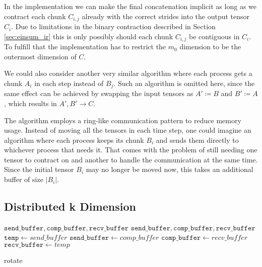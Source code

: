 In the implementation we can make the final concatenation implicit as long as we contract each chunk $C_{i,j}$ already with the correct strides into the output tensor $C_i$.
Due to limitations in the binary contraction described in Section \ref{sec:einsum_ir} this is only possibly should each chunk $C_{i,j}$ be contiguous in $C_i$.
To fulfill that the implementation has to restrict the $m_0$ dimension to be the outermost dimension of $C$.

We could also consider another very similar algorithm where each process gets a chunk $A_i$ in each step instead of $B_j$.
Such an algorithm is omitted here, since the same effect can be achieved by swapping the input tensors as $A' \coloneqq B$ and $B' \coloneqq A$, which results in $A',B' \rightarrow C$.

The algorithm employs a ring-like communication pattern to reduce memory usage.
Instead of moving all the tensors in each time step, one could imagine an algorithm where each process keeps its chunk $B_i$ and sends them directly to whichever process that needs it.
That comes with the problem of still needing one tensor to contract on and another to handle the communication at the same time.
Since the initial tensor $B_i$ may no longer be moved now, this takes an additional buffer of size $|B_i|$.

\subsection{Distributed k Dimension}


\begin{algorithm}[ht]
    \begin{algorithmic}
        \Require $\texttt{send\_buffer},\texttt{comp\_buffer},\texttt{recv\_buffer}$
        \Ensure $\texttt{send\_buffer},\texttt{comp\_buffer},\texttt{recv\_buffer}$
        \State $\texttt{temp} \gets {send\_buffer}$
        \State $\texttt{send\_buffer} \gets {comp\_buffer}$
        \State $\texttt{comp\_buffer} \gets {recv\_buffer}$
        \State $\texttt{recv\_buffer} \gets {temp}$
    \end{algorithmic}
    \caption{rotate}
    \label{rotate_pseudocode}
\end{algorithm}

